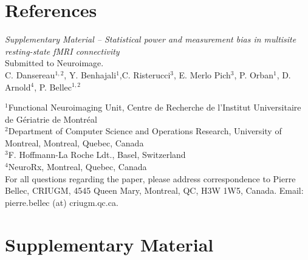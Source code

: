 \documentclass[authoryear]{elsarticle}
\begin{document}
\section*{References}





\pagebreak



\clearpage
\appendix


\clearpage
\pagebreak
\renewcommand{\thefigure}{S\arabic{figure}}
\renewcommand{\thetable}{S\arabic{table}}
\setcounter{figure}{0}
\begin{center}
\emph{Supplementary Material {--} Statistical power and measurement bias in multisite resting-state fMRI connectivity}\\

\vspace{\baselineskip}Submitted to Neuroimage.\\

\vspace{\baselineskip}C. Dansereau$^{1,2}$,  Y. Benhajali$^{1}$,C. Risterucci$^{3}$, E. Merlo Pich$^{3}$, P. Orban$^{1}$, D. Arnold$^{4}$, P. Bellec$^{1,2}$\\

\end{center}
$^1$Functional Neuroimaging Unit, Centre de Recherche de l'Institut Universitaire de G\'eriatrie de Montr\'eal\\
$^2$Department of Computer Science and Operations Research, University of Montreal, Montreal, Quebec, Canada\\
$^3$F. Hoffmann-La Roche Ldt., Basel, Switzerland\\
$^4$NeuroRx, Montreal, Quebec, Canada\\

For all questions regarding the paper, please address correspondence to Pierre Bellec, CRIUGM, 4545 Queen Mary, Montreal, QC, H3W 1W5, Canada. Email: pierre.bellec (at) criugm.qc.ca.\\

\section*{Supplementary Material} 
\end{document}
